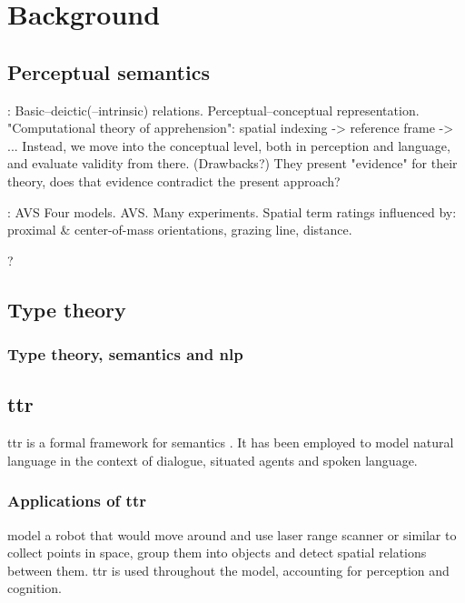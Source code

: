 \documentclass[11pt, a4paper]{article}
\begin{document}
\section{Background}

\subsection{Perceptual semantics}

\cite{LoganComputationalAnalysisApprehension1996}:
Basic–deictic(–intrinsic) relations.
Perceptual–conceptual representation.
"Computational theory of apprehension": spatial indexing -> reference frame -> ... Instead, we move into the conceptual level, both in perception and language, and evaluate validity from there.
(Drawbacks?)
They present "evidence" for their theory, does that evidence contradict the present approach?

\cite{RegierGroundingspatiallanguage2001a}:
AVS
Four models. AVS.
Many experiments.
Spatial term ratings influenced by: proximal & center-of-mass orientations, grazing line, distance.

\cite{PustejovskyPerceptualsemanticsconstruction1990}?

\subsection{Type theory}

\subsubsection{Type theory, semantics and \gls{nlp}}

\subsection{\Gls{ttr}}

\gls{ttr} is a formal framework for semantics \citep{CooperRecordsRecordTypes2005}.
It has been employed to model natural language in the context of dialogue, situated agents and spoken language.

\subsubsection{Applications of \gls{ttr}}

\cite{DobnikModellinglanguageaction2012} model a robot that would move around and use laser range scanner or similar to collect points in space, group them into objects and detect spatial relations between them.
\Gls{ttr} is used throughout the model, accounting for perception and cognition.
\end{document}
